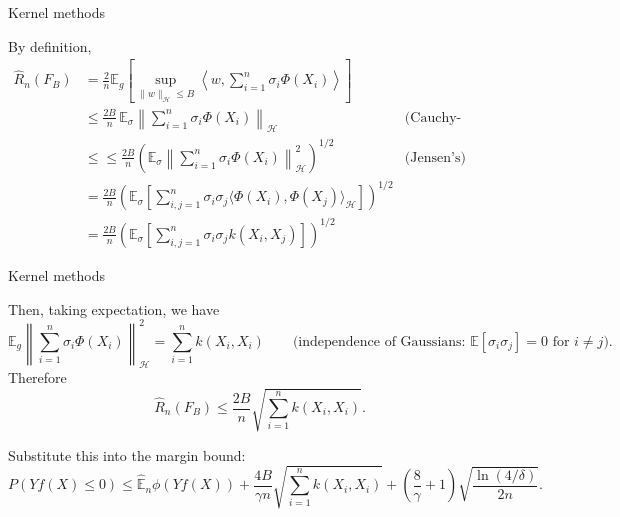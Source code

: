 \begin{frame}{Kernel methods}

By definition,
\begin{align*}
    \hat R_n(F_B)
&=
\frac{2}{n}\mathbb E_g\left[
\sup_{\|w\|_{\mathcal H}\le B}
\left\langle
w,\sum_{i=1}^n \sigma_i\Phi(X_i)
\right\rangle
\right] \\
&\leq\frac{2B}{n}\,
\mathbb E_\sigma
\left\|
\sum_{i=1}^n \sigma_i\Phi(X_i)
\right\|_{\mathcal H}  & \text{(Cauchy-Schwarz)} \\
&\le \le
\frac{2B}{n}\left(
\mathbb E_\sigma
\left\|
\sum_{i=1}^n \sigma_i\Phi(X_i)
\right\|_{\mathcal H}^2
\right)^{1/2} & \text{(Jensen's)}\\
&= \frac{2B}{n}\left(
\mathbb E_\sigma \left[
\sum_{i,j=1}^n \sigma_i \sigma_j
\langle \Phi(X_i),\Phi(X_j)\rangle_{\mathcal H}
\right]\right)^{1/2}\\
&= \frac{2B}{n}\left(
\mathbb E_\sigma\left[ \sum_{i,j=1}^n \sigma_i \sigma_j k(X_i,X_j) \right]
\right)^{1/2}
\end{align*}
\end{frame}


\begin{frame}{Kernel methods}

Then, taking expectation, we have
\[
\mathbb E_g
\left\|
\sum_{i=1}^n \sigma_i\Phi(X_i)
\right\|_{\mathcal H}^2
=
\sum_{i=1}^n k(X_i,X_i)
\qquad\text{(independence of Gaussians: \(\mathbb E[\sigma_i \sigma_j]=0\) for \(i\neq j\)).}
\]
Therefore
\[
\hat R_n(F_B)
\le
\frac{2B}{n}
\sqrt{\sum_{i=1}^n k(X_i,X_i)}.
\]

Substitute this into the margin bound:
\[
P(Yf(X)\le 0)
\le
\hat{\mathbb E}_n\phi(Yf(X))
+
\frac{4B}{\gamma n}\sqrt{\sum_{i=1}^n k(X_i,X_i)}
+
\left(\frac{8}{\gamma}+1\right)\sqrt{\frac{\ln(4/\delta)}{2n}}.
\]
\end{frame}


